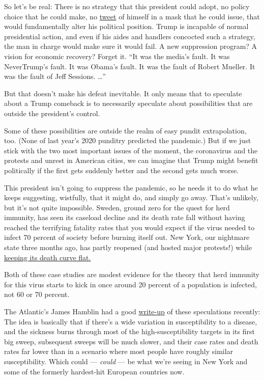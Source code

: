 So let's be real: There is no strategy that this president could adopt,
no policy choice that he could make, no
\href{https://twitter.com/realDonaldTrump/status/1285299379746811915}{tweet}
of himself in a mask that he could issue, that would fundamentally alter
his political position. Trump is incapable of normal presidential
action, and even if his aides and handlers concocted such a strategy,
the man in charge would make sure it would fail. A new suppression
program? A vision for economic recovery? Forget it. ``It was the media's
fault. It was NeverTrump's fault. It was Obama's fault. It was the fault
of Robert Mueller. It was the fault of Jeff Sessions. \ldots''

But that doesn't make his defeat inevitable. It only means that to
speculate about a Trump comeback is to necessarily speculate about
possibilities that are outside the president's control.

Some of these possibilities are outside the realm of easy pundit
extrapolation, too. (None of last year's 2020 punditry predicted the
pandemic.) But if we just stick with the two most important issues of
the moment, the coronavirus and the protests and unrest in American
cities, we can imagine that Trump might benefit politically if the first
gets suddenly better and the second gets much worse.

This president isn't going to suppress the pandemic, so he needs it to
do what he keeps suggesting, wistfully, that it might do, and simply go
away. That's unlikely, but it's not quite impossible. Sweden, ground
zero for the quest for herd immunity, has seen its caseload decline and
its death rate fall without having reached the terrifying fatality rates
that you would expect if the virus needed to infect 70 percent of
society before burning itself out. New York, our nightmare state three
months ago, has partly reopened (and hosted major protests!) while
\href{https://www1.nyc.gov/site/doh/covid/covid-19-data-deaths.page}{keeping
its death curve flat.}

Both of these case studies are modest evidence for the theory that herd
immunity for this virus starts to kick in once around 20 percent of a
population is infected, not 60 or 70 percent.

The Atlantic's James Hamblin had a good
\href{https://www.theatlantic.com/health/archive/2020/07/herd-immunity-coronavirus/614035/}{write-up}
of these speculations recently: The idea is basically that if there's a
wide variation in susceptibility to a disease, and the sickness burns
through most of the high-susceptibility targets in its first big sweep,
subsequent sweeps will be much slower, and their case rates and death
rates far lower than in a scenario where most people have roughly
similar susceptibility. Which could --- \emph{could} --- be what we're
seeing in New York and some of the formerly hardest-hit European
countries now.

